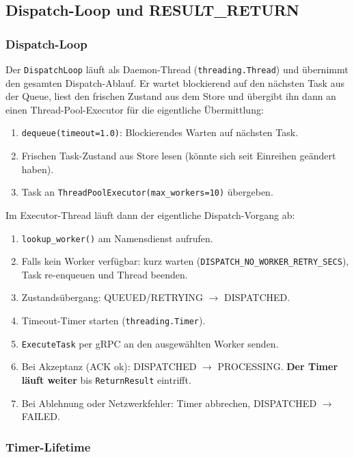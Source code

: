 \subsection{Dispatch-Loop und RESULT\_RETURN}
\label{sec:dispatch-loop}

\subsubsection*{Dispatch-Loop}

Der \texttt{DispatchLoop} läuft als Daemon-Thread (\texttt{threading.Thread})
und übernimmt den gesamten Dispatch-Ablauf. Er wartet blockierend auf den
nächsten Task aus der Queue, liest den frischen Zustand aus dem Store und
übergibt ihn dann an einen Thread-Pool-Executor für die eigentliche Übermittlung:

\begin{enumerate}
  \item \texttt{dequeue(timeout=1.0)}: Blockierendes Warten auf nächsten Task.
  \item Frischen Task-Zustand aus Store lesen (könnte sich seit Einreihen geändert haben).
  \item Task an \texttt{ThreadPoolExecutor(max\_workers=10)} übergeben.
\end{enumerate}

Im Executor-Thread läuft dann der eigentliche Dispatch-Vorgang ab:

\begin{enumerate}
  \item \texttt{lookup\_worker()} am Namensdienst aufrufen.
  \item Falls kein Worker verfügbar: kurz warten (\texttt{DISPATCH\_NO\_WORKER\_RETRY\_SECS}),
        Task re-enqueuen und Thread beenden.
  \item Zustandsübergang: QUEUED/RETRYING $\rightarrow$ DISPATCHED.
  \item Timeout-Timer starten (\texttt{threading.Timer}).
  \item \texttt{ExecuteTask} per gRPC an den ausgewählten Worker senden.
  \item Bei Akzeptanz (ACK ok): DISPATCHED $\rightarrow$ PROCESSING.
        \textbf{Der Timer läuft weiter} bis \texttt{ReturnResult} eintrifft.
  \item Bei Ablehnung oder Netzwerkfehler: Timer abbrechen,
        DISPATCHED $\rightarrow$ FAILED.
\end{enumerate}

\subsubsection*{ Timer-Lifetime}

